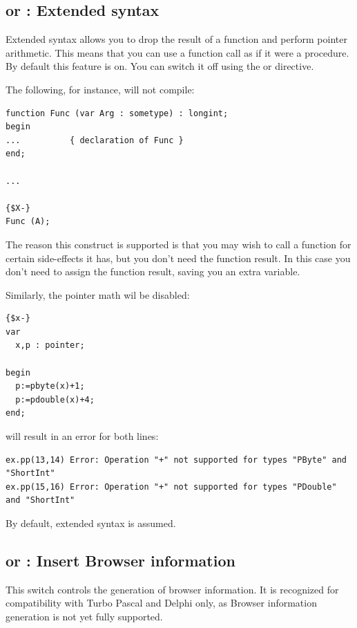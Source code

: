 \subsection{ or  : Extended syntax}

Extended syntax allows you to drop the result of a function and perform
pointer arithmetic. This means that
you can use a function call as if it were a procedure. By default this feature
is on. You can switch it off using the  or
directive.

The following, for instance, will not compile:
\begin{verbatim}
function Func (var Arg : sometype) : longint;
begin
...          { declaration of Func }
end;

...

{$X-}
Func (A);
\end{verbatim}
The reason this construct is supported is that you may wish to call a
function for certain side-effects it has, but you don't need the function
result. In this case you don't need to assign the function result, saving
you an extra variable.

Similarly, the pointer math wil be disabled:
\begin{verbatim}
{$x-}
var
  x,p : pointer;

begin
  p:=pbyte(x)+1;
  p:=pdouble(x)+4;
end;
\end{verbatim}
will result in an error for both lines:
\begin{verbatim}
ex.pp(13,14) Error: Operation "+" not supported for types "PByte" and "ShortInt"                                                            
ex.pp(15,16) Error: Operation "+" not supported for types "PDouble" and "ShortInt"
\end{verbatim}

By default, extended syntax is assumed.

\subsection{ or  : Insert Browser information}

This switch controls the generation of browser information. It is recognized
for compatibility with Turbo Pascal and Delphi only, as Browser information
generation is not yet fully supported.


